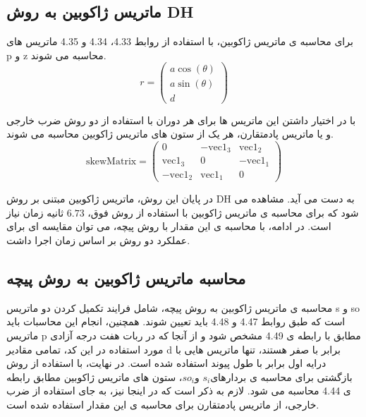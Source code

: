 \subsection*{ماتریس ژاکوبین به روش DH}

برای محاسبه ی ماتریس ژاکوبین، با استفاده از روابط 4.33، 4.34 و 4.35 ماتریس های p و z محاسبه می شوند. 
\[
r = \begin{pmatrix}
	a \cos(\theta) \\
	a \sin(\theta) \\
	d
\end{pmatrix}
\]


با در اختیار داشتن این ماتریس ها برای هر دوران با استفاده از دو روش ضرب خارجی و یا ماتریس پادمتقارن، هر یک از ستون های ماتریس ژاکوبین محاسبه می شوند.
\[
\text{skewMatrix} = 
\begin{pmatrix}
	0 & -\text{vec1}_3 & \text{vec1}_2 \\
	\text{vec1}_3 & 0 & -\text{vec1}_1 \\
	-\text{vec1}_2 & \text{vec1}_1 & 0
\end{pmatrix}
\]

در پایان این روش، ماتریس ژاکوبین مبتنی بر روش DH به دست می آید. مشاهده می شود که برای محاسبه ی ماتریس ژاکوبین با استفاده از روش فوق، $6.73$ ثانیه زمان نیاز است. در ادامه، با محاسبه ی این مقدار با روش پیچه، می توان مقایسه ای برای عملکرد دو روش بر اساس زمان اجرا داشت.

\subsection*{محاسبه ماتریس ژاکوبین به روش پیچه}
محاسبه ی ماتریس ژاکوبین به روش پیچه، شامل فرایند تکمیل کردن دو ماتریس s و so است که طبق روابط 4.47 و 4.48 باید تعیین شوند. همچنین، انجام این محاسبات باید ماتریس p مطابق با رابطه ی 4.49 مشخص شود و از آنجا که در ربات هفت درجه آزادی مورد استفاده در این کد، تمامی مقادیر d برابر با صفر هستند، تنها ماتریس هایی با درایه اول برابر با طول پیوند استفاده شده است. 
در نهایت، با استفاده از روش بازگشتی برای محاسبه ی بردارهای$ s_i$ و$ so_i$، ستون های ماتریس ژاکوبین مطابق رابطه ی 4.44 محاسبه می شود. لازم به ذکر است که در اینجا نیز، به جای استفاده از ضرب خارجی، از ماتریس پادمتقارن برای محاسبه ی این مقدار استفاده شده است.

